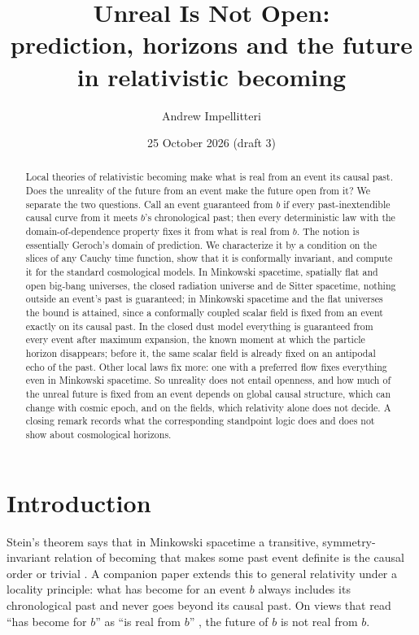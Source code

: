 \documentclass[11pt]{article}
\title{Unreal Is Not Open:\\ prediction, horizons and the future in
relativistic becoming}
\author{Andrew Impellitteri}
\date{25 October 2026 (draft 3)}
\theoremstyle{definition}
\begin{document}
\maketitle

\begin{abstract}
Local theories of relativistic becoming make what is real from an event its
causal past. Does the unreality of the future from an event make the future
open from it? We separate the two questions. Call an event guaranteed from
$b$ if every past-inextendible causal curve from it meets $b$'s chronological
past; then every deterministic law with the domain-of-dependence property
fixes it from what is real from $b$. The notion is essentially Geroch's
domain of prediction. We characterize it by a condition on the slices of any
Cauchy time function, show that it is conformally invariant, and compute it
for the standard cosmological models. In Minkowski spacetime, spatially flat
and open big-bang universes, the closed radiation universe and de Sitter
spacetime, nothing outside an event's past is guaranteed; in Minkowski
spacetime and the flat universes the bound is attained, since a conformally
coupled scalar field is fixed from an event exactly on its causal past. In
the closed dust model everything is guaranteed from every event after
maximum expansion, the known moment at which the particle horizon
disappears; before it, the same scalar field is already fixed on an
antipodal echo of the past. Other local laws fix more: one with a preferred
flow fixes everything even in Minkowski spacetime. So unreality does not
entail openness, and how much of the unreal future is fixed from an event
depends on global causal structure, which can change with cosmic epoch, and
on the fields, which relativity alone does not decide. A closing remark
records what the corresponding standpoint logic does and does not show about
cosmological horizons.
\end{abstract}

\section{Introduction}

Stein's theorem says that in Minkowski spacetime a transitive,
symmetry-invariant relation of becoming that makes some past event definite
is the causal order or trivial \citep{Stein1968,Stein1991,CH1995}. A
companion paper \citep{SteinGR} extends this to general relativity under a
locality principle: what has become for an event $b$ always includes its
chronological past and never goes beyond its causal past. On views that read
``has become for $b$'' as ``is real from $b$'' \citep{Fine2005,Lipman2023},
the future of $b$ is not real from $b$.
\end{document}
